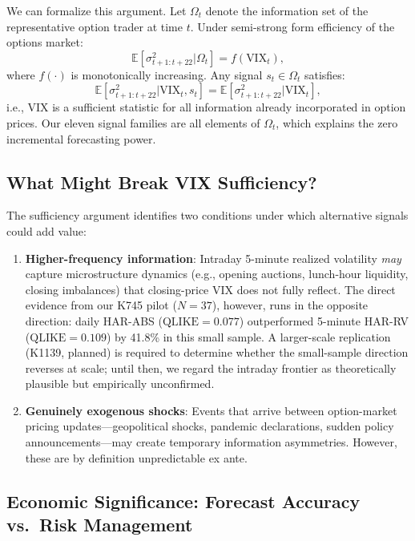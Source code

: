 \documentclass[12pt,a4paper]{article}
\begin{document}
We can formalize this argument. Let $\Omega_t$ denote the information set of the representative option trader at time $t$. Under semi-strong form efficiency of the options market:
\begin{equation}
\mathbb{E}[\sigma^2_{t+1:t+22} | \Omega_t] = f(\text{VIX}_t),
\label{eq:efficiency}
\end{equation}
where $f(\cdot)$ is monotonically increasing. Any signal $s_t \in \Omega_t$ satisfies:
\begin{equation}
\mathbb{E}[\sigma^2_{t+1:t+22} | \text{VIX}_t, s_t] = \mathbb{E}[\sigma^2_{t+1:t+22} | \text{VIX}_t],
\label{eq:sufficiency}
\end{equation}
i.e., VIX is a sufficient statistic for all information already incorporated in option prices. Our eleven signal families are all elements of $\Omega_t$, which explains the zero incremental forecasting power.

\subsection{What Might Break VIX Sufficiency?}

The sufficiency argument identifies two conditions under which alternative signals could add value:

\begin{enumerate}
    \item \textbf{Higher-frequency information}: Intraday 5-minute realized volatility \emph{may} capture microstructure dynamics (e.g., opening auctions, lunch-hour liquidity, closing imbalances) that closing-price VIX does not fully reflect. The direct evidence from our K745 pilot ($N = 37$), however, runs in the opposite direction: daily HAR-ABS ($\text{QLIKE} = 0.077$) outperformed 5-minute HAR-RV ($\text{QLIKE} = 0.109$) by 41.8\% in this small sample. A larger-scale replication (K1139, planned) is required to determine whether the small-sample direction reverses at scale; until then, we regard the intraday frontier as theoretically plausible but empirically unconfirmed.

    \item \textbf{Genuinely exogenous shocks}: Events that arrive between option-market pricing updates---geopolitical shocks, pandemic declarations, sudden policy announcements---may create temporary information asymmetries. However, these are by definition unpredictable ex ante.
\end{enumerate}

\subsection{Economic Significance: Forecast Accuracy vs.\ Risk Management}
\label{sec:economic_significance}
\end{document}
